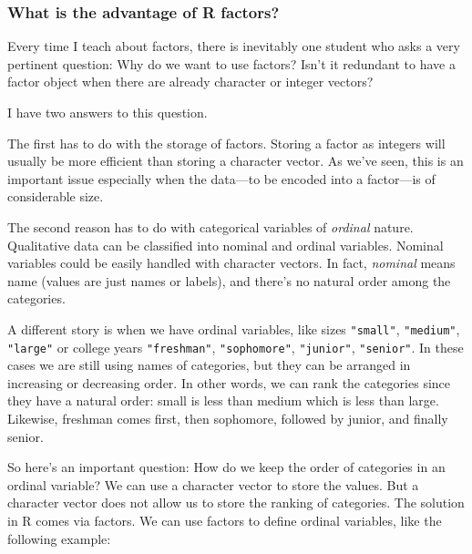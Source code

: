 \documentclass[
]{book}
\begin{document}
\hypertarget{what-is-the-advantage-of-r-factors}{%
\subsubsection*{What is the advantage of R factors?}\label{what-is-the-advantage-of-r-factors}}

Every time I teach about factors, there is inevitably one student who asks a
very pertinent question: Why do we want to use factors? Isn't it redundant to
have a factor object when there are already character or integer vectors?

I have two answers to this question.

The first has to do with the storage of factors. Storing a factor as integers
will usually be more efficient than storing a character vector. As we've seen,
this is an important issue especially when the data---to be encoded into a
factor---is of considerable size.

The second reason has to do with categorical variables of \emph{ordinal} nature.
Qualitative data can be classified into nominal and ordinal variables. Nominal
variables could be easily handled with character vectors. In fact, \emph{nominal}
means name (values are just names or labels), and there's no natural order
among the categories.

A different story is when we have ordinal variables, like sizes \texttt{"small"},
\texttt{"medium"}, \texttt{"large"} or college years \texttt{"freshman"}, \texttt{"sophomore"}, \texttt{"junior"},
\texttt{"senior"}. In these cases we are still using names of categories, but they
can be arranged in increasing or decreasing order. In other words, we can rank
the categories since they have a natural order: small is less than medium which
is less than large. Likewise, freshman comes first, then sophomore, followed by
junior, and finally senior.

So here's an important question: How do we keep the order of categories in an
ordinal variable? We can use a character vector to store the values. But a
character vector does not allow us to store the ranking of categories. The
solution in R comes via factors. We can use factors to define ordinal variables,
like the following example:
\end{document}
